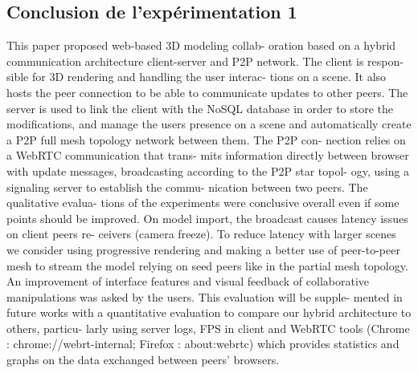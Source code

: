 \subsection{Conclusion de l'expérimentation 1}

This paper proposed web-based 3D modeling collab- oration based on a hybrid 
communication architecture client-server and P2P network. The client is respon- 
sible for 3D rendering and handling the user interac- tions on a scene. It also hosts 
the peer connection to be able to communicate updates to other peers. The server 
is used to link the client with the NoSQL database in order to store the 
modifications, and manage the users presence on a scene and automatically 
create a P2P full mesh topology network between them. The P2P con- nection 
relies on a WebRTC communication that trans- mits information directly between 
browser with update messages, broadcasting according to the P2P star topol- ogy, 
using a signaling server to establish the commu- nication between two peers. The 
qualitative evalua- tions of the experiments were conclusive overall even if some 
points should be improved. On model import, the broadcast causes latency issues 
on client peers re- ceivers (camera freeze). To reduce latency with larger scenes 
we consider using progressive rendering and making a better use of peer-to-peer 
mesh to stream the model relying on seed peers like in the partial mesh topology. 
An improvement of interface features and visual feedback of collaborative 
manipulations was asked by the users. This evaluation will be supple- mented in 
future works with a quantitative evaluation to compare our hybrid architecture to 
others, particu- larly using server logs, FPS in client and WebRTC tools (Chrome : 
chrome://webrt-internal; Firefox : about:webrtc) which provides statistics and 
graphs on the data exchanged between peers’ browsers.